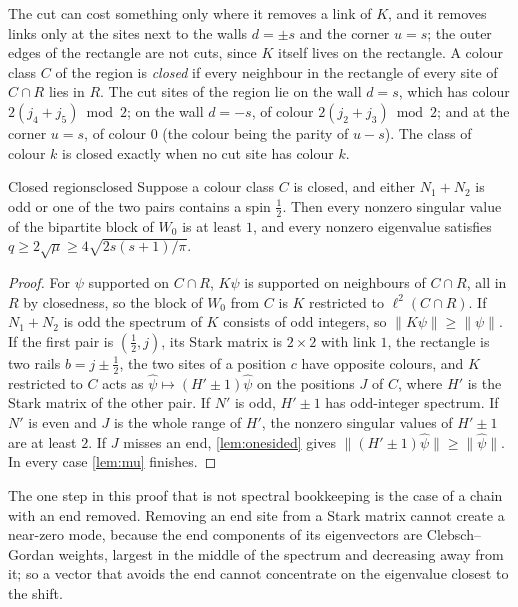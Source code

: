 The cut can cost something only where it removes a link of $K$, and it removes links
only at the sites next to the walls $d=\pm s$ and the corner $u=s$; the outer edges of
the rectangle are not cuts, since $K$ itself lives on the rectangle. A colour class
$C$ of the region is \emph{closed} if every neighbour in the rectangle of every site of
$C\cap R$ lies in $R$. The cut sites of the region lie on the wall $d=s$, which has
colour $2(j_4+j_5)\bmod2$; on the wall $d=-s$, of colour $2(j_2+j_3)\bmod2$; and at the
corner $u=s$, of colour $0$ (the colour being the parity of $u-s$). The class of colour
$k$ is closed exactly when no cut site has colour $k$.

\begin{theorem}{Closed regions}{closed}
Suppose a colour class $C$ is closed, and either $N_1+N_2$ is odd or one of the two
pairs contains a spin $\frac12$. Then every nonzero singular value of the bipartite
block of $W_0$ is at least $1$, and every nonzero eigenvalue satisfies
$q\ge2\sqrt\mu\ge4\sqrt{2s(s+1)/\pi}$.
\end{theorem}

\begin{proof}
For $\psi$ supported on $C\cap R$, $K\psi$ is supported on neighbours of $C\cap R$,
all in $R$ by closedness, so the block of $W_0$ from $C$ is $K$ restricted to
$\ell^2(C\cap R)$. If $N_1+N_2$ is odd the spectrum of $K$ consists of odd integers, so
$\|K\psi\|\ge\|\psi\|$. If the first pair is $(\frac12,j)$, its Stark matrix is
$2\times2$ with link $1$, the rectangle is two rails $b=j\pm\frac12$, the two sites
of a position $c$ have opposite colours, and $K$ restricted to $C$ acts as
$\hat\psi\mapsto(H'\pm1)\hat\psi$ on the positions $J$ of $C$, where $H'$ is the
Stark matrix of the other pair. If $N'$ is odd, $H'\pm1$ has odd-integer spectrum. If
$N'$ is even and $J$ is the whole range of $H'$, the nonzero singular values of
$H'\pm1$ are at least $2$. If $J$ misses an end, \cref{lem:onesided} gives
$\|(H'\pm1)\hat\psi\|\ge\|\hat\psi\|$. In every case \cref{lem:mu} finishes.
\end{proof}

The one step in this proof that is not spectral bookkeeping is the case of a chain
with an end removed. Removing an end site from a Stark matrix cannot create a
near-zero mode, because the end components of its eigenvectors are Clebsch--Gordan
weights, largest in the middle of the spectrum and decreasing away from it; so a
vector that avoids the end cannot concentrate on the eigenvalue closest to the shift.

